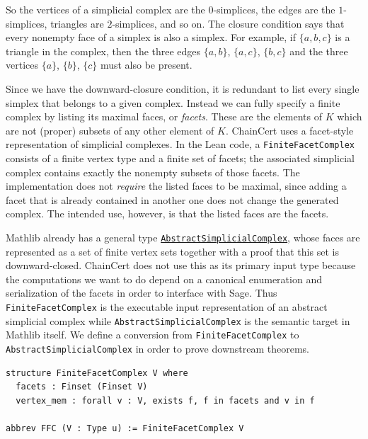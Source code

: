 \documentclass[11pt]{article}
\theoremstyle{plain}
\theoremstyle{definition}
\theoremstyle{remark}
\newcommand{\lean}[1]{\lstinline[language=lean]|#1|}
\begin{document}
So the vertices of a simplicial complex are the $0$-simplices, the edges are the $1$-simplices, triangles are $2$-simplices, and so on. The closure condition says that every nonempty face of a simplex is also a simplex. For example, if $\{a,b,c\}$ is a triangle in the
complex, then the three edges $\{a,b\}$, $\{a,c\}$, $\{b,c\}$ and the three
vertices $\{a\}$, $\{b\}$, $\{c\}$ must also be present. 

Since we have the downward-closure condition, it is redundant to list every single simplex that belongs to a given complex. Instead we can fully specify a finite complex by listing its maximal faces, or \textit{facets}. These are the elements of $K$ which are not (proper) subsets of any other element of $K$. ChainCert uses a facet-style representation of simplicial complexes.
In the Lean code, a \lean{FiniteFacetComplex} consists of a finite vertex type
and a finite set of facets; the associated simplicial complex contains exactly
the nonempty subsets of those facets. The implementation does not \textit{require} the
listed faces to be maximal, since adding a facet that is already contained in
another one does not change the generated complex. The intended use, however, is that the listed faces are the facets. 

Mathlib already has a general type \href{https://leanprover-community.github.io/mathlib4_docs/Mathlib/AlgebraicTopology/SimplicialComplex/Basic.html#AbstractSimplicialComplex}{\nolinkurl{AbstractSimplicialComplex}}, whose faces are represented as a set of finite vertex sets together with a proof that this set is downward-closed. ChainCert does not use this as its primary input type because the computations we want to do depend on a canonical enumeration and serialization of the facets in order to interface with Sage. Thus \lean{FiniteFacetComplex} is the executable input representation of an abstract simplicial complex while \lean{AbstractSimplicialComplex} is the semantic target in Mathlib itself. We define a conversion from \lean{FiniteFacetComplex} to \lean{AbstractSimplicialComplex} in order to prove downstream theorems.

\begin{lstlisting}[caption={The finite facet-complex representation used by ChainCert.},label={lst:finite-facet-complex}]
structure FiniteFacetComplex V where
  facets : Finset (Finset V)
  vertex_mem : forall v : V, exists f, f in facets and v in f

abbrev FFC (V : Type u) := FiniteFacetComplex V
\end{lstlisting}
\end{document}
